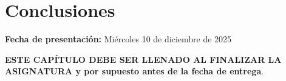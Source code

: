 \documentclass[../portafolio.tex]{subfiles}
\begin{document}
\chapter*{Conclusiones}

\hfill \textbf{Fecha de presentación:} Miércoles 10 de diciembre de 2025

\medskip

\textbf{\color{red} ESTE CAPÍTULO DEBE SER LLENADO AL FINALIZAR LA ASIGNATURA y por supuesto antes de la fecha de entrega}.





\end{document}
